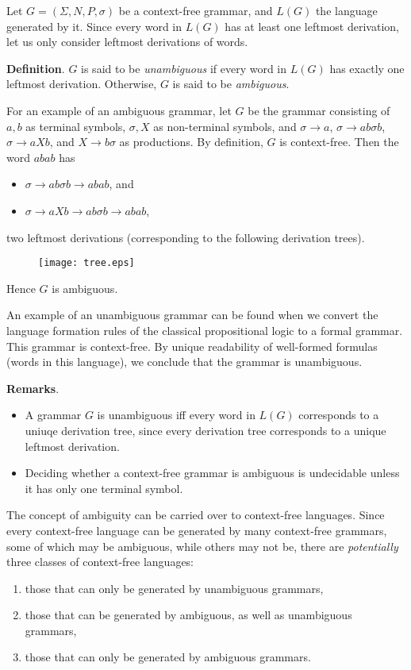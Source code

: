 \documentclass[12pt]{article}
\begin{document}
Let $G=(\Sigma, N, P, \sigma)$ be a context-free grammar, and $L(G)$ the language generated by it.  Since every word in $L(G)$ has at least one leftmost derivation, let us only consider leftmost derivations of words.

\textbf{Definition}.  $G$ is said to be \emph{unambiguous} if every word in $L(G)$ has exactly one leftmost derivation.  Otherwise, $G$ is said to be \emph{ambiguous}.

For an example of an ambiguous grammar, let $G$ be the grammar consisting of $a,b$ as terminal symbols, $\sigma,X$ as non-terminal symbols, and $\sigma\to a$, $\sigma \to ab\sigma b$, $\sigma \to aXb$, and $X\to b\sigma$ as productions.  By definition, $G$ is context-free.  Then the word $abab$ has
\begin{itemize}
\item $\sigma\to ab\sigma b \to abab$, and
\item $\sigma\to aXb \to ab\sigma b \to abab$,
\end{itemize}
two leftmost derivations (corresponding to the following derivation trees).  

\begin{figure}[htp]
\centering
\texttt{[image: tree.eps]}
\end{figure}

Hence $G$ is ambiguous.

An example of an unambiguous grammar can be found when we convert the language formation rules of the classical propositional logic to a formal grammar.  This grammar is context-free.  By unique readability of well-formed formulas (words in this language), we conclude that the grammar is unambiguous.

\textbf{Remarks}.  
\begin{itemize}
\item A grammar $G$ is unambiguous iff every word in $L(G)$ corresponds to a uniuqe derivation tree, since every derivation tree corresponds to a unique leftmost derivation.
\item Deciding whether a context-free grammar is ambiguous is undecidable unless it has only one terminal symbol.
\end{itemize}

The concept of ambiguity can be carried over to context-free languages.  Since every context-free language can be generated by many context-free grammars, some of which may be ambiguous, while others may not be, there are \emph{potentially} three classes of context-free languages:
\begin{enumerate}
\item those that can only be generated by unambiguous grammars,
\item those that can be generated by ambiguous, as well as unambiguous grammars,
\item those that can only be generated by ambiguous grammars.
\end{enumerate}
\end{document}
